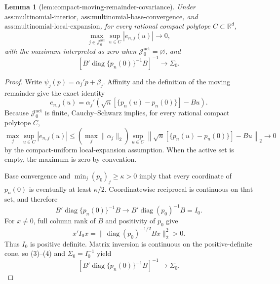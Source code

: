 \documentclass{article}
\newtheorem{lemma}{Lemma}
\begin{document}
\begin{lemma}[lem:compact-moving-remainder-covariance]\label{lem:compact-moving-remainder-covariance}
Under \(\text{ass:multinomial-interior}\), \(\text{ass:multinomial-base-convergence}\), and \(\text{ass:multinomial-local-expansion}\), for every rational compact polytope \(C\subset\mathbb R^d\),
\[
 \max_{j\in\mathcal J_0^{\mathrm{act}}}\sup_{u\in C}|e_{n,j}(u)|\longrightarrow0,
\]
with the maximum interpreted as zero when \(\mathcal J_0^{\mathrm{act}}=\varnothing\), and
\[
 \left[B'\operatorname{diag}\{p_n(0)\}^{-1}B\right]^{-1}\longrightarrow
 \Sigma_0.
\]
\end{lemma}
\begin{proof}
Write \(\psi_j(p)=\alpha_j'p+\beta_j\).  Affinity and the definition of the moving remainder give the exact identity
\[
 e_{n,j}(u)=\alpha_j'
 \left(\sqrt n[\{p_n(u)-p_n(0)\}]-Bu\right).
\tag{1}
\]
Because \(\mathcal J_0^{\mathrm{act}}\) is finite, Cauchy--Schwarz implies, for every rational compact polytope \(C\),
\[
 \max_j\sup_{u\in C}|e_{n,j}(u)|
 \leq\left(\max_j\|\alpha_j\|_2\right)
 \sup_{u\in C}\left\|\sqrt n[\{p_n(u)-p_n(0)\}]-Bu\right\|_2
 \longrightarrow0
\tag{2}
\]
by the compact-uniform local-expansion assumption.  When the active set is empty, the maximum is zero by convention.

Base convergence and \(\min_j(p_0)_j\geq\kappa>0\) imply that every coordinate of \(p_n(0)\) is eventually at least \(\kappa/2\).  Coordinatewise reciprocal is continuous on that set, and therefore
\[
 B'\operatorname{diag}\{p_n(0)\}^{-1}B
 \longrightarrow B'\operatorname{diag}(p_0)^{-1}B=I_0.
\tag{3}
\]
For \(x\ne0\), full column rank of \(B\) and positivity of \(p_0\) give
\[
 x'I_0x=\|\operatorname{diag}(p_0)^{-1/2}Bx\|_2^2>0.
\tag{4}
\]
Thus \(I_0\) is positive definite.  Matrix inversion is continuous on the positive-definite cone, so (3)--(4) and \(\Sigma_0=I_0^{-1}\) yield
\[
 [B'\operatorname{diag}\{p_n(0)\}^{-1}B]^{-1}\longrightarrow\Sigma_0.
\tag{5}
\]
\end{proof}
\end{document}
